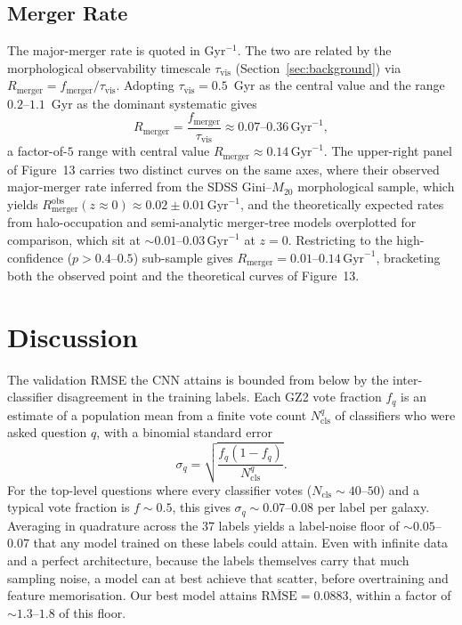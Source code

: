 \documentclass[10pt,preprint2]{aastex}
\begin{document}
\subsection{Merger Rate}

The \citet{Lotz2011} major-merger rate is quoted in Gyr$^{-1}$. The two are related by the morphological observability timescale $\tau_{\mathrm{vis}}$ (Section~\ref{sec:background}) via $R_{\mathrm{merger}} = f_{\mathrm{merger}} / \tau_{\mathrm{vis}}$. Adopting $\tau_{\mathrm{vis}} = 0.5$~Gyr as the central value and the \citet{Lotz2008} range $0.2$--$1.1$~Gyr as the dominant systematic gives
\begin{equation}
R_{\mathrm{merger}} = \frac{f_{\mathrm{merger}}}{\tau_{\mathrm{vis}}} \approx 0.07\text{--}0.36\,\mathrm{Gyr}^{-1},
\end{equation}
a factor-of-$5$ range with central value $R_{\mathrm{merger}} \approx 0.14\,\mathrm{Gyr}^{-1}$. The upper-right panel of \citet{Lotz2011} Figure~13 carries two distinct curves on the same axes, where their observed major-merger rate inferred from the SDSS Gini--$M_{20}$ morphological sample, which yields $R_{\mathrm{merger}}^{\mathrm{obs}}(z \approx 0) \approx 0.02 \pm 0.01\,\mathrm{Gyr}^{-1}$, and the theoretically expected rates from halo-occupation and semi-analytic merger-tree models overplotted for comparison, which sit at $\sim 0.01$--$0.03\,\mathrm{Gyr}^{-1}$ at $z = 0$. Restricting to the high-confidence ($p > 0.4$--$0.5$) sub-sample gives $R_{\mathrm{merger}} = 0.01$--$0.14\,\mathrm{Gyr}^{-1}$, bracketing both the observed point and the theoretical curves of \citet{Lotz2011} Figure~13.


\section{Discussion}
\label{sec:discussion}

The validation RMSE the CNN attains is bounded from below by the inter-classifier disagreement in the training labels. Each GZ2 vote fraction $f_q$ is an estimate of a population mean from a finite vote count $N_{\mathrm{cls}}^q$ of classifiers who were asked question $q$, with a binomial standard error
\begin{equation}
  \sigma_q = \sqrt{\frac{f_q (1 - f_q)}{N_{\mathrm{cls}}^q}}.
  \label{eq:label_noise_floor}
\end{equation}
For the top-level questions where every classifier votes ($N_{\mathrm{cls}} \sim 40$--$50$) and a typical vote fraction is $f \sim 0.5$, this gives $\sigma_q \sim 0.07$--$0.08$ per label per galaxy. Averaging in quadrature across the 37 labels yields a label-noise floor of $\sim 0.05$--$0.07$ that any model trained on these labels could attain. Even with infinite data and a perfect architecture, because the labels themselves carry that much sampling noise, a model can at best achieve that scatter, before overtraining and feature memorisation. Our best model attains $\overline{\mathrm{RMSE}} = 0.0883$, within a factor of $\sim 1.3$--$1.8$ of this floor. 
\end{document}
